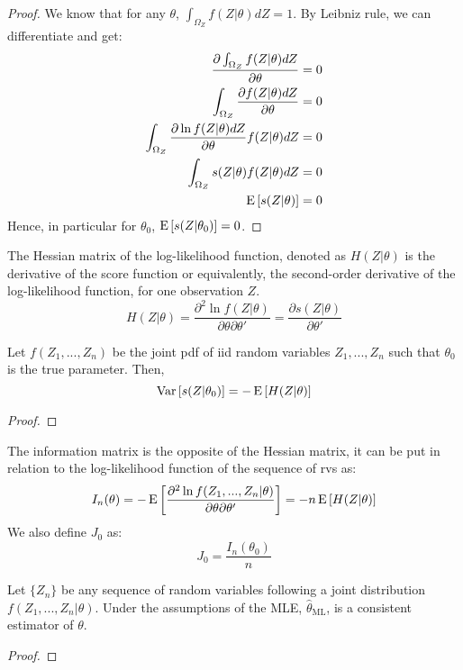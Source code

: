 \begin{proof}
We know that for any $\theta$, $\int_{\Omega_Z} f(Z\vert\theta)dZ = 1$. By Leibniz rule, we can differentiate and get:\begin{align*}
\frac{\partial \int_{\Omega_Z} f(Z\vert\theta)dZ}{\partial \theta} & = 0 \\ \int_{\Omega_Z} \frac{\partial f(Z\vert\theta)dZ}{\partial \theta} & = 0 \\ \int_{\Omega_Z} \frac{\partial \ln f(Z\vert\theta)dZ}{\partial \theta} f(Z\vert\theta)dZ  & = 0 \\ \int_{\Omega_Z} s(Z\vert\theta) f(Z\vert\theta)dZ  & = 0 \\ \operatorname{E}\left[s(Z\vert\theta)\right]&=0
\end{align*} Hence, in particular for $\theta_0$, $\operatorname{E}\left[s(Z\vert\theta_0)\right]=0$.
\end{proof}

\begin{definition}
The Hessian matrix of the log-likelihood function, denoted as $H(Z\vert\theta)$ is the derivative of the score function or equivalently, the second-order derivative of the log-likelihood function, for one observation $Z$. $$H(Z\vert\theta) = \frac{\partial^2 \ln f(Z\vert \theta)}{\partial \theta\partial\theta'} = \frac{\partial s(Z\vert \theta)}{\partial\theta'}$$
\end{definition}

\begin{proposition}
Let $f(Z_1, ..., Z_n)$ be the joint pdf of iid random variables $Z_1, ..., Z_n$ such that $\theta_0$ is the true parameter. Then, $$\operatorname{Var}\left[s(Z\vert\theta_0)\right]=-\operatorname{E}\left[H(Z\vert\theta)\right]$$
\end{proposition}

\begin{proof}

\end{proof}

\begin{definition}
The information matrix is the opposite of the Hessian matrix, it can be put in relation to the log-likelihood function of the sequence of rvs as: $$I_n(\theta) = -\operatorname{E}\left[\frac{\partial^2 \ln f(Z_1, ..., Z_n\vert \theta)}{\partial \theta\partial\theta'}\right] = - n\operatorname{E}\left[H(Z\vert\theta)\right]$$ We also define $J_0$ as: $$J_0 = \frac{I_n(\theta_0)}{n} $$
\end{definition}

\begin{theorem}
Let $\{Z_n\}$ be any sequence of random variables following a joint distribution $f(Z_1, ..., Z_n\vert \theta)$. Under the assumptions of the MLE, $\hat\theta_{\text{ML}}$, is a consistent estimator of $\theta$.
\end{theorem}
\begin{proof}

\end{proof}

